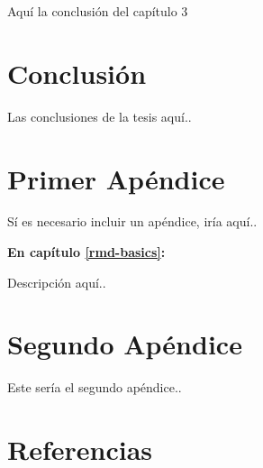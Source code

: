 \documentclass[12pt,oneside]{reedthesis}
\begin{document}
Aquí la conclusión del capítulo 3\\

\hfill\break

\chapter*{Conclusión}\label{conclusiuxf3n-3}

Las conclusiones de la tesis aquí..

\appendix

\chapter{Primer Apéndice}\label{primer-apuxe9ndice}

Sí es necesario incluir un apéndice, iría aquí..

\textbf{En capítulo \ref{rmd-basics}:}

Descripción aquí..

\chapter{Segundo Apéndice}\label{segundo-apuxe9ndice}

Este sería el segundo apéndice..

\backmatter

\chapter*{Referencias}\label{referencias}

\printbibliography[heading=none]


\noindent

\setlength{\parindent}{-0.20in}


\end{document}
